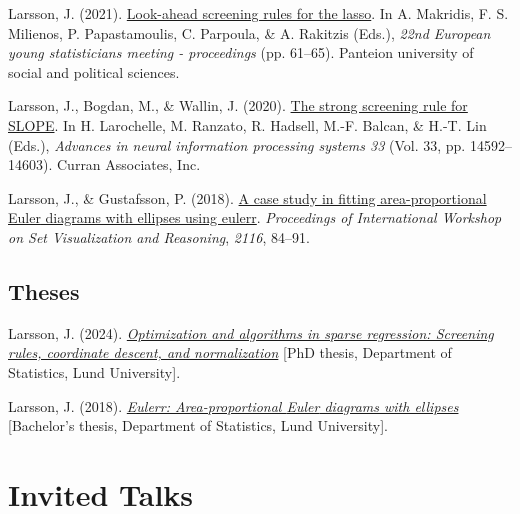 \documentclass[
  a4paper,
]{article}
\newlength{\cslhangindent}
\newenvironment{CSLReferences}[2] %
 {\begin{list}{}{%
  \setlength{\itemindent}{0pt}
  \setlength{\leftmargin}{0pt}
  \setlength{\parsep}{0pt}
  \ifodd #1
   \setlength{\leftmargin}{\cslhangindent}
   \setlength{\itemindent}{-1\cslhangindent}
  \fi
  \setlength{\itemsep}{#2\baselineskip}}}
 {\end{list}}
\begin{document}
\begin{CSLReferences}{1}{0}
Larsson, J. (2021).
\href{https://www.eysm2021.panteion.gr/files/Proceedings/\%5FEYSM/\%5F2021.pdf}{Look-ahead
screening rules for the lasso}. In A. Makridis, F. S. Milienos, P.
Papastamoulis, C. Parpoula, \& A. Rakitzis (Eds.), \emph{22nd {European}
young statisticians meeting - proceedings} (pp. 61--65). {Panteion
university of social and political sciences}.

Larsson, J., Bogdan, M., \& Wallin, J. (2020).
\href{\%0A\%20\%20\%20\%20https://papers.nips.cc/paper/\%5Ffiles/paper/2020/hash/a7d8ae4569120b5bec12e7b6e9648b86-Abstract.html\%0A\%20\%20}{The
strong screening rule for {SLOPE}}. In H. Larochelle, M. Ranzato, R.
Hadsell, M.-F. Balcan, \& H.-T. Lin (Eds.), \emph{Advances in neural
information processing systems 33} (Vol. 33, pp. 14592--14603). Curran
Associates, Inc.

Larsson, J., \& Gustafsson, P. (2018).
\href{http://ceur-ws.org/Vol-2116/paper7.pdf}{A case study in fitting
area-proportional {Euler} diagrams with ellipses using eulerr}.
\emph{Proceedings of International Workshop on Set Visualization and
Reasoning}, \emph{2116}, 84--91.

\end{CSLReferences}

\subsection{Theses}\label{theses}

\protect{}\label{refs-theses}
\begin{CSLReferences}{1}{0}
Larsson, J. (2024).
\emph{\href{https://lup.lub.lu.se/record/0b9c97e8-5f65-43eb-9f7a-c4f237568370}{Optimization
and algorithms in sparse regression: Screening rules, coordinate
descent, and normalization}} {[}PhD thesis, Department of Statistics,
Lund University{]}.

Larsson, J. (2018).
\emph{\href{http://lup.lub.lu.se/student-papers/record/8934042}{Eulerr:
Area-proportional {Euler} diagrams with ellipses}} {[}Bachelor's thesis,
Department of Statistics, Lund University{]}.

\end{CSLReferences}

\section{Invited Talks}\label{invited-talks}
\end{document}
